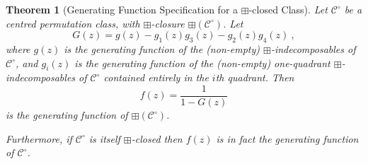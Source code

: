 \documentclass[11pt,a4paper]{article}
\newtheorem{thm}{Theorem}[section]
\theoremstyle{definition}
\newtheorem{comment}[thm]{Comment}
\begin{document}
\begin{thm}[Generating Function Specification for a $\boxplus$-closed Class]\label{genfuncspec}
Let $\mathcal{C}^{\circ}$ be a centred permutation class, with $\boxplus$-closure $\boxplus\left(\mathcal{C}^{\circ}\right)$. Let
\[
G(z) = g(z) - g_{1}(z)g_{3}(z) - g_{2}(z)g_{4}(z) \ ,
\]
where $g(z)$ is the generating function of the (non-empty) $\boxplus$-indecomposables of $\mathcal{C}^{\circ}$, and $g_{i}(z)$ is the generating function of the (non-empty) one-quadrant $\boxplus$-indecomposables of $\mathcal{C}^{\circ}$ contained entirely in the $i$th quadrant.
Then
\[
f(z) = \frac{1}{1 - G(z)}
\]
is the generating function of $\boxplus\left(\mathcal{C}^{\circ}\right)$.

Furthermore, if $\mathcal{C}^{\circ}$ is itself $\boxplus$-closed then $f(z)$ is in fact the generating function of $\mathcal{C}^{\circ}$.
\end{thm}

\end{document}
